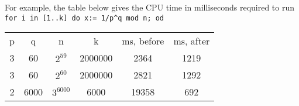 
For example, the table below gives the CPU time in milliseconds required
to run \verb|for i in [1..k] do x:= 1/p^q mod n; od|

\begin{center}
\begin{tabular}{| c | c | c | c | c | c |} 
\hline
p & q    & n          & k        & ms, before & ms, after \\
3 & 60   & $2^{59}$   & 2000000  & 2364       & 1219 \\
3 & 60   & $2^{60}$   & 2000000  & 2821       & 1292 \\
2 & 6000 & $3^{6000}$ & 6000     & 19358      & 692  \\
\hline
\end{tabular}
\end{center}

%
%

%
%

%
%
%

